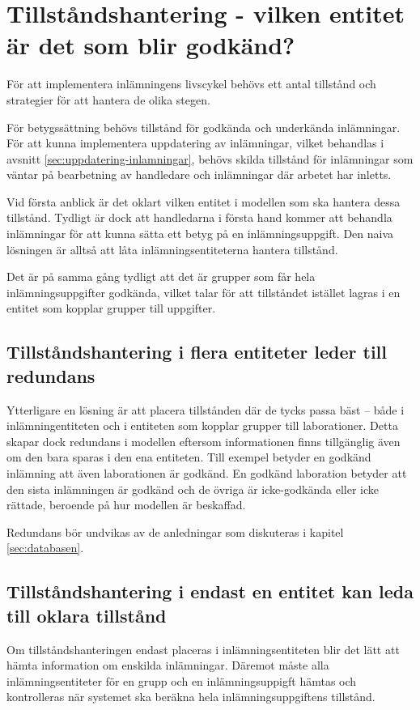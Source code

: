 \section{Tillståndshantering - vilken entitet är det som blir godkänd?}

För att implementera inlämningens livscykel behövs ett antal tillstånd och strategier för att hantera de olika stegen.

För betygssättning behövs tillstånd för godkända och underkända inlämningar. För att kunna implementera uppdatering av inlämningar, vilket behandlas i avsnitt \ref{sec:uppdatering-inlamningar}, behövs skilda tillstånd för inlämningar som väntar på bearbetning av handledare och inlämningar där arbetet har inletts.

Vid första anblick är det oklart vilken entitet i modellen som ska hantera dessa tillstånd. Tydligt är dock att handledarna i första hand kommer att behandla inlämningar för att kunna sätta ett betyg på en inlämningsuppgift. Den naiva lösningen är alltså att låta inlämningsentiteterna hantera tillstånd.

Det är på samma gång tydligt att det är grupper som får hela inlämningsuppgifter godkända, vilket talar för att tillståndet istället lagras i en entitet som kopplar grupper till uppgifter.

\subsection{Tillståndshantering i flera entiteter leder till redundans}
Ytterligare en lösning är att placera tillstånden där de tycks passa bäst – både i inlämningentiteten och i entiteten som kopplar grupper till laborationer. Detta skapar dock redundans i modellen eftersom informationen finns tillgänglig även om den bara sparas i den ena entiteten. Till exempel betyder en godkänd inlämning att även laborationen är godkänd. En godkänd laboration betyder att den sista inlämningen är godkänd och de övriga är icke-godkända eller icke rättade, beroende på hur modellen är beskaffad.

Redundans bör undvikas av de anledningar som diskuteras i kapitel \ref{sec:databasen}.

\subsection{Tillståndshantering i endast en entitet kan leda till oklara tillstånd}
Om tillståndshanteringen endast placeras i inlämningsentiteten blir det lätt att hämta information om enskilda inlämningar. Däremot måste alla inlämningsentiteter för en grupp och en inlämningsuppigft hämtas och kontrolleras när systemet ska beräkna hela inlämningsuppgiftens tillstånd.

